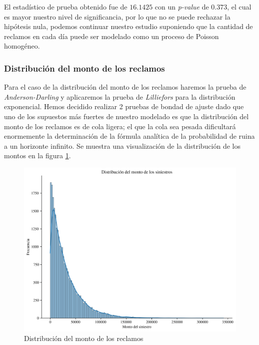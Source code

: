 \documentclass[journal]{IEEEtran}
\begin{document}
                El estadístico de prueba obtenido fue de $16.1425$ con un \textit{p-value} de $0.373$, el cual es mayor nuestro nivel de significancia, por lo que no se puede rechazar la hipótesis nula, podemos continuar nuestro estudio suponiendo que la cantidad de reclamos en cada día puede ser modelado como un proceso de Poisson homogéneo.

            \subsubsection{Distribución del monto de los reclamos}

                Para el caso de la distribución del monto de los reclamos haremos la prueba de \textit{Anderson-Darling}\cite{evans2008distribution} y aplicaremos la prueba de \emph{Lilliefors} \cite{lilliefors1969kolmogorov} para la distribución exponencial. Hemos decidido realizar 2 pruebas de bondad de ajuste dado que uno de los supuestos más fuertes de nuestro modelado es que la distribución del monto de los reclamos es de cola ligera; el que la cola sea pesada dificultará enormemente la determinación de la fórmula analítica de la probabilidad de ruina a un horizonte infinito. Se muestra una visualización de la distribución de los montos en la figura \ref{img:amount-dist}.
                \begin{figure}[!htbp]
                    \centering
                    \includegraphics[scale=0.42]{img/amount_dist.png}
                    \caption{Distribución del monto de los reclamos}
                    \label{img:amount-dist}
                \end{figure}
\end{document}
